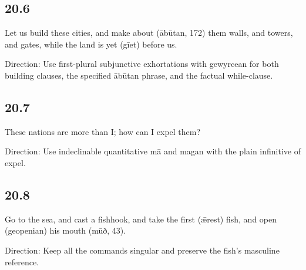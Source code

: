 \subsection*{20.6}

\par\begin{minipage}{\linewidth}\raggedright
Let us build these cities, and make about (ābūtan, 172) them walls, and towers, and gates, while the land is yet (gīet) before us.

Direction: Use first-plural subjunctive exhortations with gewyrcean for both building clauses, the specified ābūtan phrase, and the factual while-clause.

\end{minipage}\par\addvspace{4pt}

\subsection*{20.7}

\par\begin{minipage}{\linewidth}\raggedright
These nations are more than I; how can I expel them?

Direction: Use indeclinable quantitative mā and magan with the plain infinitive of expel.

\end{minipage}\par\addvspace{4pt}

\subsection*{20.8}

\par\begin{minipage}{\linewidth}\raggedright
Go to the sea, and cast a fishhook, and take the first (ǣrest) fish, and open (geopenian) his mouth (mūð, 43).

Direction: Keep all the commands singular and preserve the fish’s masculine reference.

\end{minipage}\par\addvspace{4pt}


